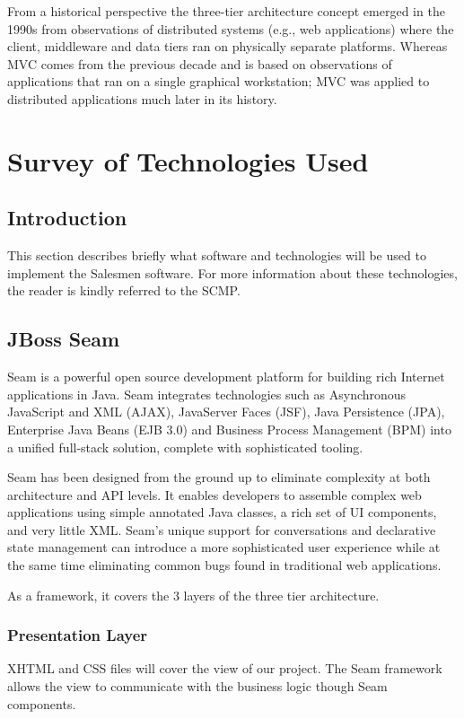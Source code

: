 \documentclass[a4paper, 12pt]{report}
\begin{document}
From a historical perspective the three-tier architecture concept emerged in the 1990s from observations of distributed systems (e.g., web applications) where the client, middleware and data tiers ran on physically separate platforms. Whereas MVC comes from the previous decade and is based on observations of applications that ran on a single graphical workstation; MVC was applied to distributed applications much later in its history.


\section{Survey of Technologies Used}
\subsection{Introduction}
This section describes briefly what software and technologies will be used to implement the Salesmen software. For more information about these technologies, the reader is kindly referred to the SCMP.

\subsection{JBoss Seam}
Seam is a powerful open source development platform for building rich Internet applications in Java. Seam integrates technologies such as Asynchronous JavaScript and XML (AJAX), JavaServer Faces (JSF), Java Persistence (JPA), Enterprise Java Beans (EJB 3.0) and Business Process Management (BPM) into a unified full-stack solution, complete with sophisticated tooling.

Seam has been designed from the ground up to eliminate complexity at both architecture and API levels. It enables developers to assemble complex web applications using simple annotated Java classes, a rich set of UI components, and very little XML. Seam's unique support for conversations and declarative state management can introduce a more sophisticated user experience while at the same time eliminating common bugs found in traditional web applications.

As a framework, it covers the 3 layers of the three tier architecture.

\subsubsection{Presentation Layer}
XHTML and CSS files will cover the view of our project. The Seam framework allows the view to communicate with the business logic though Seam components.
\end{document}
